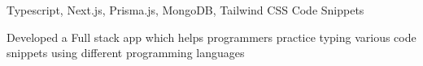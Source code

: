 

\begin{cventries}

  \projectentry
    {Typescript, Next.js, Prisma.js, MongoDB, Tailwind CSS} %
    {Code Snippets 
      } %
    {} %
    {}
    {
      \begin{cvitems} %
        \item {Developed a Full stack app which helps programmers practice typing various code snippets using different programming languages}
      \end{cvitems}
    }

\end{cventries}
